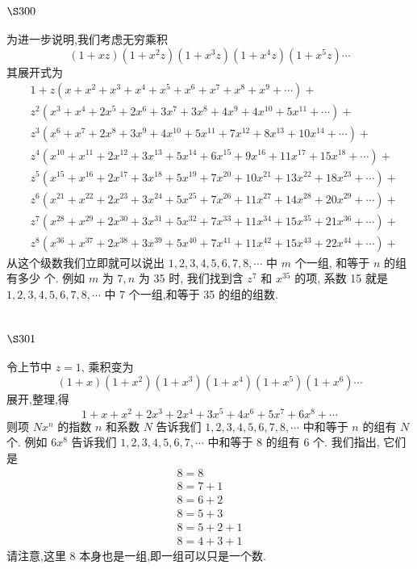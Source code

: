 \section{$\S 300$}

为进一步说明,我们考虑无穷乘积
\[
(1+x z)\left(1+x^{2} z\right)\left(1+x^{3} z\right)\left(1+x^{4} z\right)\left(1+x^{5} z\right) \cdots
\]
其展开式为
\[
\begin{aligned}
& 1+z\left(x+x^{2}+x^{3}+x^{4}+x^{5}+x^{6}+x^{7}+x^{8}+x^{9}+\cdots\right)+ \\
& z^{2}\left(x^{3}+x^{4}+2 x^{5}+2 x^{6}+3 x^{7}+3 x^{8}+4 x^{9}+4 x^{10}+5 x^{11}+\cdots\right)+ \\
& z^{3}\left(x^{6}+x^{7}+2 x^{8}+3 x^{9}+4 x^{10}+5 x^{11}+7 x^{12}+8 x^{13}+10 x^{14}+\cdots\right)+ \\
& z^{4}\left(x^{10}+x^{11}+2 x^{12}+3 x^{13}+5 x^{14}+6 x^{15}+9 x^{16}+11 x^{17}+15 x^{18}+\cdots\right)+ \\
& z^{5}\left(x^{15}+x^{16}+2 x^{17}+3 x^{18}+5 x^{19}+7 x^{20}+10 x^{21}+13 x^{22}+18 x^{23}+\cdots\right)+ \\
& z^{6}\left(x^{21}+x^{22}+2 x^{23}+3 x^{24}+5 x^{25}+7 x^{26}+11 x^{27}+14 x^{28}+20 x^{29}+\cdots\right)+ \\
& z^{7}\left(x^{28}+x^{29}+2 x^{30}+3 x^{31}+5 x^{32}+7 x^{33}+11 x^{34}+15 x^{35}+21 x^{36}+\cdots\right)+ \\
& z^{8}\left(x^{36}+x^{37}+2 x^{38}+3 x^{39}+5 x^{40}+7 x^{41}+11 x^{42}+15 x^{43}+22 x^{44}+\cdots\right)+
\end{aligned}
\]
从这个级数我们立即就可以说出 $1,2,3,4,5,6,7,8, \cdots$ 中 $m$ 个一组, 和等于 $n$ 的组有多少 个. 例如 $m$ 为 $7, n$ 为 35 时, 我们找到含 $z^{7}$ 和 $x^{35}$ 的项, 系数 15 就是 $1,2,3,4,5,6,7,8, \cdots$ 中 7 个一组,和等于 35 的组的组数.

\section{$\S 301$}

令上节中 $z=1$, 乘积变为
\[
(1+x)\left(1+x^{2}\right)\left(1+x^{3}\right)\left(1+x^{4}\right)\left(1+x^{5}\right)\left(1+x^{6}\right) \cdots
\]
展开,整理,得
\[
1+x+x^{2}+2 x^{3}+2 x^{4}+3 x^{5}+4 x^{6}+5 x^{7}+6 x^{8}+\cdots
\]
则项 $N x^{n}$ 的指数 $n$ 和系数 $N$ 告诉我们 $1,2,3,4,5,6,7,8, \cdots$ 中和等于 $n$ 的组有 $N$ 个. 例如 $6 x^{8}$ 告诉我们 $1,2,3,4,5,6,7, \cdots$ 中和等于 8 的组有 6 个. 我们指出, 它们是
\[
\begin{gathered}
8=8 \\
8=7+1 \\
8=6+2 \\
8=5+3 \\
8=5+2+1 \\
8=4+3+1
\end{gathered}
\]
请注意,这里 8 本身也是一组,即一组可以只是一个数. 

